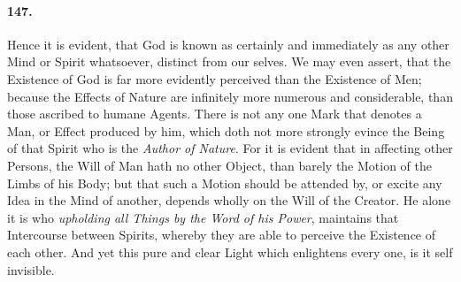 \documentclass[]{article}
\newenvironment{sectionbody}{\begin{multicols}{2}}{\end{multicols}}
\begin{document}
\begin{sectionbody}
\paragraph{147.} Hence it is evident, that {\sc God} is known as certainly and
immediately as any other Mind or Spirit whatsoever, distinct from
our selves.  We may even assert, that the Existence of {\sc God}
is far more evidently perceived than the Existence of Men;
because the Effects of Nature are infinitely more numerous and
considerable, than those ascribed to humane Agents.  There is not
any one Mark that denotes a Man, or Effect produced by him, which
doth not more strongly evince the Being of that Spirit who is the
\emph{Author of Nature}.  For it is evident that in affecting
other Persons, the Will of Man hath no other Object, than barely
the Motion of the Limbs of his Body; but that such a Motion
should be attended by, or excite any Idea in the Mind of another,
depends wholly on the Will of the {\sc Creator}.  He alone it is
who \emph{upholding all Things by the Word of his Power},
maintains that Intercourse between Spirits, whereby they are able
to perceive the Existence of each other.  And yet this pure and
clear Light which enlightens every one, is it self invisible.




\end{sectionbody}
\end{document}
